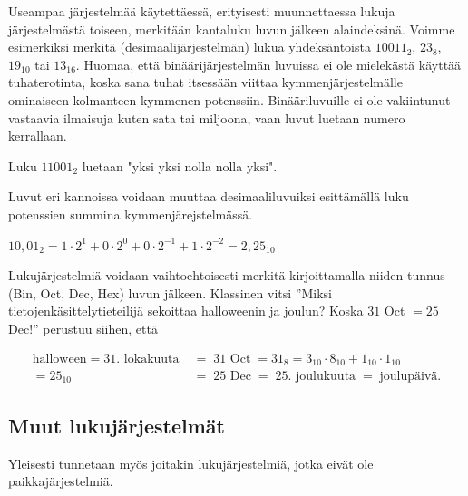 Useampaa järjestelmää käytettäessä, erityisesti muunnettaessa lukuja järjestelmästä toiseen, merkitään kantaluku luvun jälkeen alaindeksinä. Voimme esimerkiksi merkitä (desimaalijärjestelmän) lukua yhdeksäntoista $10011_2$, $23_8$, $19_{10}$ tai $13_{16}$. Huomaa, että binäärijärjestelmän luvuissa ei ole mielekästä käyttää tuhaterotinta, koska sana tuhat itsessään viittaa kymmenjärjestelmälle ominaiseen kolmanteen kymmenen potenssiin. Binääriluvuille ei ole vakiintunut vastaavia ilmaisuja kuten sata tai miljoona, vaan luvut luetaan numero kerrallaan.

\begin{esimerkki}
Luku $11001_2$ luetaan "yksi yksi nolla nolla yksi".
\end{esimerkki}

Luvut eri kannoissa voidaan muuttaa desimaaliluvuiksi esittämällä luku potenssien summina kymmenjärejstelmässä.


\begin{esimerkki}
$10,01_2 = 1 \cdot 2^1 + 0 \cdot 2^0 + 0 \cdot 2^{-1} + 1 \cdot 2^{-2} = 2,25_{10}$
\end{esimerkki} %


Lukujärjestelmiä voidaan vaihtoehtoisesti merkitä kirjoittamalla niiden tunnus (Bin, Oct, Dec, Hex) luvun jälkeen. Klassinen vitsi ''Miksi tietojenkäsittelytieteilijä sekoittaa halloweenin ja joulun? Koska $31$ Oct $= 25$ Dec!'' perustuu siihen, että

\begin{align*}
	\text{halloween} \; = \; \text{31. lokakuuta} \; &= \; \text{31 Oct} \; = 31_8 = 3_{10} \cdot 8_{10} + 1_{10} \cdot 1_{10} \\
	= {25}_{10} &= \; \text{25 Dec} \; = \; \text{25. joulukuuta} \; = \; \text{joulupäivä.}
\end{align*} %

\subsection*{Muut lukujärjestelmät}

Yleisesti tunnetaan myös joitakin lukujärjestelmiä, jotka eivät ole paikkajärjestelmiä.

